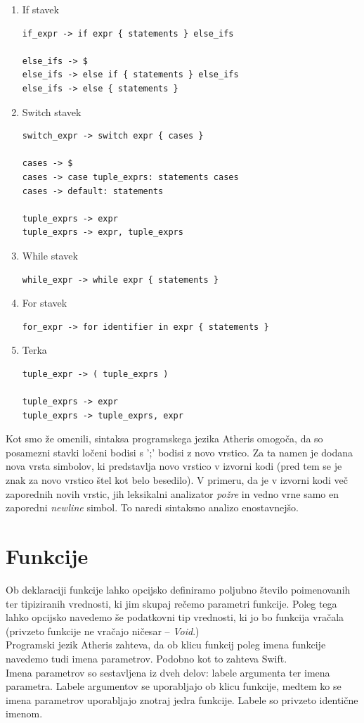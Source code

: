 \documentclass[a4paper, 12p]{book}
\begin{document}
\begin{enumerate}
	\item If stavek
\begin{lstlisting}[]
if_expr -> if expr { statements } else_ifs
			
else_ifs -> $
else_ifs -> else if { statements } else_ifs
else_ifs -> else { statements }
\end{lstlisting}
	\item Switch stavek
\begin{lstlisting}[]
switch_expr -> switch expr { cases }

cases -> $
cases -> case tuple_exprs: statements cases
cases -> default: statements

tuple_exprs -> expr
tuple_exprs -> expr, tuple_exprs
\end{lstlisting}
	\item While stavek
\begin{lstlisting}[]
while_expr -> while expr { statements }
\end{lstlisting}
	\item For stavek
\begin{lstlisting}[]
for_expr -> for identifier in expr { statements }
\end{lstlisting}
	\item Terka
\begin{lstlisting}
tuple_expr -> ( tuple_exprs )

tuple_exprs -> expr
tuple_exprs -> tuple_exprs, expr
\end{lstlisting}
\end{enumerate} 

Kot smo že omenili, sintaksa programskega jezika Atheris omogoča, da so posamezni stavki ločeni bodisi s ';' bodisi z novo vrstico. Za ta namen je dodana nova vrsta simbolov, ki predstavlja novo vrstico v izvorni kodi (pred tem se je znak za novo vrstico štel kot belo besedilo). V primeru, da je v izvorni kodi več zaporednih novih vrstic, jih leksikalni analizator \textit{požre} in vedno vrne samo en zaporedni \textit{newline} simbol. To naredi sintaksno analizo enostavnejšo. 

\section{Funkcije}

Ob deklaraciji funkcije lahko opcijsko definiramo poljubno število poimenovanih ter tipiziranih vrednosti, ki jim skupaj rečemo parametri funkcije. Poleg tega lahko opcijsko navedemo še podatkovni tip vrednosti, ki jo bo funkcija vračala (privzeto funkcije ne vračajo ničesar – \textit{Void}.)\\
\indent Programski jezik Atheris zahteva, da ob klicu funkcij poleg imena funkcije navedemo tudi imena parametrov. Podobno kot to zahteva Swift. \\
\indent Imena parametrov so sestavljena iz dveh delov: labele argumenta ter imena parametra. Labele argumentov se uporabljajo ob klicu funkcije, medtem ko se imena parametrov uporabljajo znotraj jedra funkcije. Labele so privzeto identične imenom.
\end{document}
